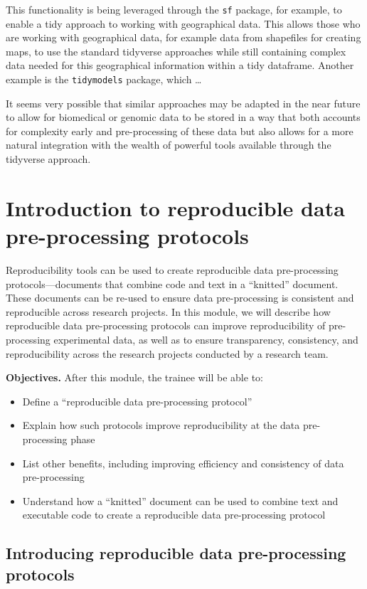 \documentclass[]{tufte-book}
\providecommand{\tightlist}{%
  \setlength{\itemsep}{0pt}\setlength{\parskip}{0pt}}
\begin{document}
This functionality is being leveraged through the \texttt{sf}
package, for example, to enable a tidy approach to working with geographical
data. This allows those who are working with geographical data, for example data
from shapefiles for creating maps, to use the standard tidyverse approaches
while still containing complex data needed for this geographical information
within a tidy dataframe. Another example is the \texttt{tidymodels} package, which \ldots{}

It seems very possible that similar approaches may be adapted in the near future
to allow for biomedical or genomic data to be stored in a way that both accounts
for complexity early and pre-processing of these data but also allows for a more
natural integration with the wealth of powerful tools available through the
tidyverse approach.

\section{Introduction to reproducible data pre-processing protocols}\label{module18}

Reproducibility tools can be used to create reproducible data pre-processing
protocols---documents that combine code and text in a ``knitted'' document. These
documents can be re-used to ensure data pre-processing is consistent and
reproducible across research projects. In this module, we will describe how
reproducible data pre-processing protocols can improve reproducibility of
pre-processing experimental data, as well as to ensure transparency,
consistency, and reproducibility across the research projects conducted by a
research team.

\textbf{Objectives.} After this module, the trainee will be able to:

\begin{itemize}
\tightlist
\item
  Define a ``reproducible data pre-processing protocol''
\item
  Explain how such protocols improve reproducibility at the data pre-processing
  phase
\item
  List other benefits, including improving efficiency and consistency of data
  pre-processing
\item
  Understand how a ``knitted'' document can be used to combine text and
  executable code to create a reproducible data pre-processing protocol
\end{itemize}

\subsection{Introducing reproducible data pre-processing protocols}\label{introducing-reproducible-data-pre-processing-protocols}
\end{document}
